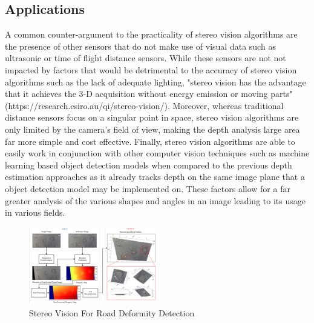 \documentclass[11pt]{scrartcl}
\begin{document}
\subsection{Applications}
A common counter-argument to the practicality of stereo vision algorithms 
are the presence of other sensors that do not make use of visual data such 
as ultrasonic or time of flight distance sensors. While these sensors are not
not impacted by factors that would be detrimental to the accuracy of stereo 
vision algorithms such as the lack of adequate lighting,  
"stereo vision has the advantage that it achieves the 3-D acquisition without 
energy emission or moving parts" (https://research.csiro.au/qi/stereo-vision/). Moreover,
whereas traditional distance sensors focus on a singular point in space, stereo vision 
algorithms are only limited by the camera's field of view, making the depth analysis
large area far more simple and cost effective. Finally, stereo vision algorithms are able 
to easily work in conjunction with other 
computer vision techniques such as machine learning based object detection
models when compared to the previous depth estimation approaches as it already
tracks depth on the same image plane that a object detection model may be implemented on.
These factors allow for a far greater analysis of the 
various shapes and angles in an image leading to its usage in various fields. 
\\ 
\begin{figure}
\centering
\includegraphics[width=0.5\textwidth]{img1.png}
\caption{\label{fig:frog1}Stereo Vision For Road Deformity Detection}
\end{figure}
\end{document}
